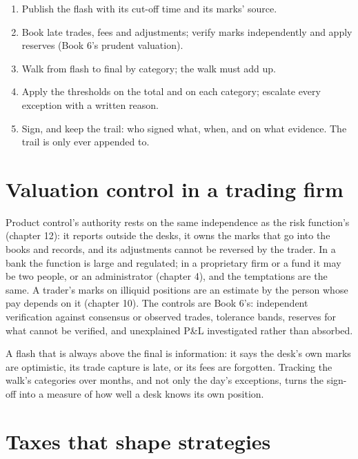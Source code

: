 \begin{method}\label{met:fm:finance-product-control-and-tax:sign}
\begin{enumerate}
\item Publish the flash with its cut-off time and its marks' source.
\item Book late trades, fees and adjustments; verify marks independently and apply reserves (Book 6's prudent valuation).
\item Walk from flash to final by category; the walk must add up.
\item Apply the thresholds on the total and on each category; escalate every exception with a written reason.
\item Sign, and keep the trail: who signed what, when, and on what evidence. The trail is only ever appended to.
\end{enumerate}
\end{method}

\section{Valuation control in a trading firm}

Product control's authority rests on the same independence as the risk function's (chapter 12): it reports outside the desks, it owns the marks
that go into the books and records, and its adjustments cannot be reversed by the trader. In a bank the function is large and regulated; in a
proprietary firm or a fund it may be two people, or an administrator (chapter 4), and the temptations are the same. A trader's marks on
illiquid positions are an estimate by the person whose pay depends on it (chapter 10). The controls are Book 6's: independent verification against
consensus or observed trades, tolerance bands, reserves for what cannot be verified, and unexplained P\&L investigated rather than absorbed.

\begin{remark}\label{rem:fm:finance-product-control-and-tax:flash}
A flash that is always above the final is information: it says the desk's own marks are optimistic, its trade capture is late, or its fees are
forgotten. Tracking the walk's categories over months, and not only the day's exceptions, turns the sign-off into a measure of how well a desk
knows its own position.
\end{remark}

\section{Taxes that shape strategies}

